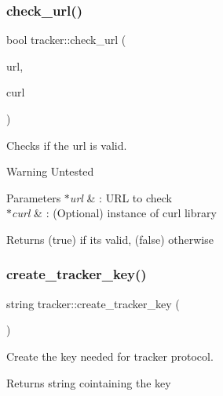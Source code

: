 \subsubsection{\texorpdfstring{check\+\_\+url()}{check\_url()}}
{\footnotesize\ttfamily bool tracker\+::check\+\_\+url (\begin{DoxyParamCaption}\item[{const string \&}]{url,  }\item[{C\+U\+RL $\ast$}]{curl }\end{DoxyParamCaption})}



Checks if the url is valid. 

\begin{DoxyWarning}{Warning}
Untested
\end{DoxyWarning}

\begin{DoxyParams}{Parameters}
{\em $\ast$url} & \+: U\+RL to check \\
\hline
{\em $\ast$curl} & \+: (Optional) instance of curl library\\
\hline
\end{DoxyParams}
\begin{DoxyReturn}{Returns}
(true) if it\textquotesingle{}s valid, (false) otherwise 
\end{DoxyReturn}
\mbox{\label{namespacetracker_a722dfd0ec93e84bbbd448d2c9d6a9f1b}} 
\subsubsection{\texorpdfstring{create\+\_\+tracker\+\_\+key()}{create\_tracker\_key()}}
{\footnotesize\ttfamily string tracker\+::create\+\_\+tracker\+\_\+key (\begin{DoxyParamCaption}{ }\end{DoxyParamCaption})}



Create the key needed for tracker protocol. 

\begin{DoxyReturn}{Returns}
string cointaining the key 
\end{DoxyReturn}
\mbox{\label{namespacetracker_ace1983d55d0f9efca5948d0a69d25ba6}} 
